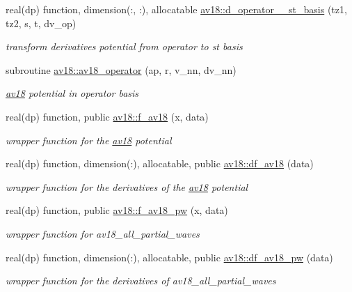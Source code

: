 \begin{DoxyCompactItemize}
real(dp) function, dimension(\+:, \+:), allocatable \hyperlink{namespaceav18_a19a966bb1b322e2d9e2c8816a6634ebb}{av18\+::d\+\_\+operator\+\_\+\_\+st\+\_\+basis} (tz1, tz2, s, t, dv\+\_\+op)
\begin{DoxyCompactList}\small\item\em transform derivatives potential from operator to st basis \end{DoxyCompactList}\item 
subroutine \hyperlink{namespaceav18_a371b28a37a073022fcb2d0cedc770b21}{av18\+::av18\+\_\+operator} (ap, r, v\+\_\+nn, dv\+\_\+nn)
\begin{DoxyCompactList}\small\item\em \hyperlink{namespaceav18}{av18} potential in operator basis \end{DoxyCompactList}\item 
real(dp) function, public \hyperlink{namespaceav18_a111cfac79051da99e0b5895e5370c2bc}{av18\+::f\+\_\+av18} (x, data)
\begin{DoxyCompactList}\small\item\em wrapper function for the \hyperlink{namespaceav18}{av18} potential \end{DoxyCompactList}\item 
real(dp) function, dimension(\+:), allocatable, public \hyperlink{namespaceav18_a6bc9abd9cec28d438ad5228c84238cbb}{av18\+::df\+\_\+av18} (data)
\begin{DoxyCompactList}\small\item\em wrapper function for the derivatives of the \hyperlink{namespaceav18}{av18} potential \end{DoxyCompactList}\item 
real(dp) function, public \hyperlink{namespaceav18_a4092b1449c0991611a4a0be131e56e66}{av18\+::f\+\_\+av18\+\_\+pw} (x, data)
\begin{DoxyCompactList}\small\item\em wrapper function for av18\+\_\+all\+\_\+partial\+\_\+waves \end{DoxyCompactList}\item 
real(dp) function, dimension(\+:), allocatable, public \hyperlink{namespaceav18_a8b7b43084d226bd7404444269717d26c}{av18\+::df\+\_\+av18\+\_\+pw} (data)
\begin{DoxyCompactList}\small\item\em wrapper function for the derivatives of av18\+\_\+all\+\_\+partial\+\_\+waves \end{DoxyCompactList}\end{DoxyCompactItemize}
